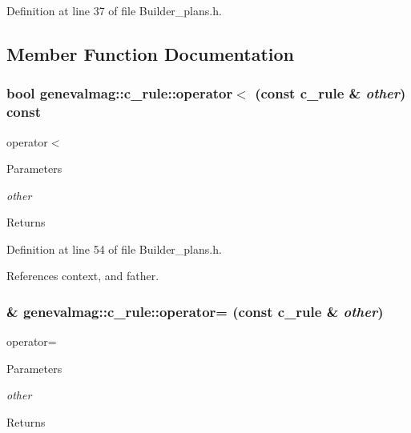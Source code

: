 Definition at line 37 of file Builder\_\-plans.h.



\subsection{Member Function Documentation}
\hypertarget{structgenevalmag_1_1c__rule_a3928c94cdc0cbf19afd122f7b5f55cba}{
\subsubsection[{operator$<$}]{\setlength{\rightskip}{0pt plus 5cm}bool genevalmag::c\_\-rule::operator$<$ (const {\bf c\_\-rule} \& {\em other}) const}}
\label{structgenevalmag_1_1c__rule_a3928c94cdc0cbf19afd122f7b5f55cba}
operator$<$ 
\begin{DoxyParams}{Parameters}
\item[{\em other}]\end{DoxyParams}
\begin{DoxyReturn}{Returns}

\end{DoxyReturn}


Definition at line 54 of file Builder\_\-plans.h.



References context, and father.

\hypertarget{structgenevalmag_1_1c__rule_a84c13f21cf310be7b9f8eb5677806581}{
\subsubsection[{operator=}]{\& genevalmag::c\_\-rule::operator= (const {\bf c\_\-rule} \& {\em other})}}
\label{structgenevalmag_1_1c__rule_a84c13f21cf310be7b9f8eb5677806581}
operator= 
\begin{DoxyParams}{Parameters}
\item[{\em other}]\end{DoxyParams}
\begin{DoxyReturn}{Returns}

\end{DoxyReturn}


